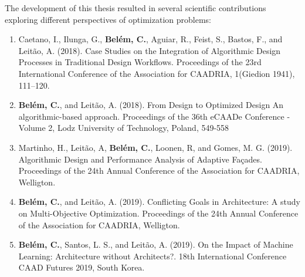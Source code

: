 The development of this thesis resulted in several scientific contributions exploring different perspectives of optimization problems:

\begin{enumerate}
\item Caetano, I., Ilunga, G., \textbf{Belém, C.}, Aguiar, R., Feist, S., Bastos, F., and Leitão, A. (2018). Case Studies on the Integration of Algorithmic Design Processes in Traditional Design Workflows. Proceedings of the 23rd International Conference of the Association for CAADRIA, 1(Giedion 1941), 111–120.

\item \textbf{Belém, C.}, and Leitão, A. (2018). From Design to Optimized Design An algorithmic-based approach. Proceedings of the 36th eCAADe Conference - Volume 2, Lodz University of Technology, Poland, 549-558

\item Martinho, H., Leitão, A, \textbf{Belém, C.}, Loonen, R, and Gomes, M. G. (2019). Algorithmic Design and Performance Analysis of Adaptive Façades. Proceedings of the 24th Annual Conference of the Association for CAADRIA, Welligton.

\item \textbf{Belém, C.}, and Leitão, A. (2019). Conflicting Goals in Architecture: A study on Multi-Objective Optimization. Proceedings of the 24th Annual Conference of the Association for CAADRIA, Welligton.

\item \textbf{Belém, C.}, Santos, L. S., and Leitão, A. (2019). On the Impact of Machine Learning: Architecture without Architects?. 18th International Conference CAAD Futures 2019, South Korea.


\end{enumerate}



